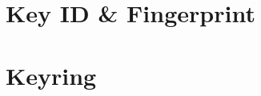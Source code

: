 


\section{Key ID \&{} Fingerprint}
\label{section:pre:keyid}




\section{Keyring}
\label{section:pre:keyring}






